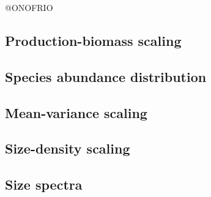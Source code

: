 \documentclass[12pt]{article}
\begin{document}
@ONOFRIO

\subsection{Production-biomass scaling}
\subsection{Species abundance distribution}
\subsection{Mean-variance scaling}
\subsection{Size-density scaling}
\subsection{Size spectra}

\printbibliography
\end{document}
